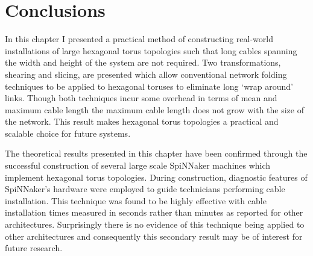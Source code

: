	\section{Conclusions}
		
		In this chapter I presented a practical method of constructing real-world
		installations of large hexagonal torus topologies such that long cables
		spanning the width and height of the system are not required. Two
		transformations, shearing and slicing, are presented which allow
		conventional network folding techniques to be applied to hexagonal toruses
		to eliminate long `wrap around' links. Though both techniques incur some
		overhead in terms of mean and maximum cable length the maximum cable length
		does not grow with the size of the network. This result makes hexagonal
		torus topologies a practical and scalable choice for future systems.
		
		The theoretical results presented in this chapter have been confirmed
		through the successful construction of several large scale SpiNNaker
		machines which implement hexagonal torus topologies. During construction,
		diagnostic features of SpiNNaker's hardware were employed to guide
		technicians performing cable installation. This technique was found to be
		highly effective with cable installation times measured in seconds rather
		than minutes as reported for other architectures. Surprisingly there is no
		evidence of this technique being applied to other architectures and
		consequently this secondary result may be of interest for future research.

